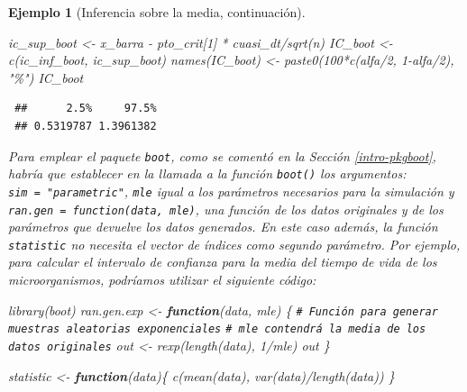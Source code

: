 \documentclass[
]{book}
\newenvironment{Shaded}{\begin{snugshade}}{\end{snugshade}}
\newcommand{\CommentTok}[1]{\textcolor[rgb]{0.56,0.35,0.01}{\textit{#1}}}
\newcommand{\ControlFlowTok}[1]{\textcolor[rgb]{0.13,0.29,0.53}{\textbf{#1}}}
\newcommand{\DecValTok}[1]{\textcolor[rgb]{0.00,0.00,0.81}{#1}}
\newcommand{\FunctionTok}[1]{\textcolor[rgb]{0.00,0.00,0.00}{#1}}
\newcommand{\NormalTok}[1]{#1}
\newcommand{\OtherTok}[1]{\textcolor[rgb]{0.56,0.35,0.01}{#1}}
\newcommand{\SpecialCharTok}[1]{\textcolor[rgb]{0.00,0.00,0.00}{#1}}
\newcommand{\StringTok}[1]{\textcolor[rgb]{0.31,0.60,0.02}{#1}}
\theoremstyle{break}
\newtheorem{example}{Ejemplo}[chapter]
\theoremstyle{nonumberplain}
\renewcommand{\CommentTok}[1]{\textcolor[rgb]{0.41,0.41,0.41}{\texttt{#1}}}
\begin{document}
\begin{example}[Inferencia sobre la media, continuación]
\begin{Shaded}
\begin{Highlighting}[]
\NormalTok{ic\_sup\_boot }\OtherTok{\textless{}{-}}\NormalTok{ x\_barra }\SpecialCharTok{{-}}\NormalTok{ pto\_crit[}\DecValTok{1}\NormalTok{] }\SpecialCharTok{*}\NormalTok{ cuasi\_dt}\SpecialCharTok{/}\FunctionTok{sqrt}\NormalTok{(n)}
\NormalTok{IC\_boot }\OtherTok{\textless{}{-}} \FunctionTok{c}\NormalTok{(ic\_inf\_boot, ic\_sup\_boot)}
\FunctionTok{names}\NormalTok{(IC\_boot) }\OtherTok{\textless{}{-}} \FunctionTok{paste0}\NormalTok{(}\DecValTok{100}\SpecialCharTok{*}\FunctionTok{c}\NormalTok{(alfa}\SpecialCharTok{/}\DecValTok{2}\NormalTok{, }\DecValTok{1}\SpecialCharTok{{-}}\NormalTok{alfa}\SpecialCharTok{/}\DecValTok{2}\NormalTok{), }\StringTok{"\%"}\NormalTok{)}
\NormalTok{IC\_boot}
\end{Highlighting}
\end{Shaded}

\begin{verbatim}
 ##      2.5%     97.5% 
 ## 0.5319787 1.3961382
\end{verbatim}

Para emplear el paquete \texttt{boot}, como se comentó en la Sección
\ref{intro-pkgboot}, habría que establecer en la llamada a la
función \texttt{boot()} los argumentos: \texttt{sim\ =\ "parametric"},
\texttt{mle} igual a los parámetros necesarios para la simulación y
\texttt{ran.gen\ =\ function(data,\ mle)}, una función de los datos originales
y de los parámetros que devuelve los datos generados.
En este caso además, la función \texttt{statistic} no necesita el vector
de índices como segundo parámetro.
Por ejemplo, para calcular el intervalo de confianza para la media del
tiempo de vida de los microorganismos, podríamos utilizar el siguiente código:

\begin{Shaded}
\begin{Highlighting}[]
\FunctionTok{library}\NormalTok{(boot)}
\NormalTok{ran.gen.exp }\OtherTok{\textless{}{-}} \ControlFlowTok{function}\NormalTok{(data, mle) \{}
    \CommentTok{\# Función para generar muestras aleatorias exponenciales}
    \CommentTok{\# mle contendrá la media de los datos originales}
\NormalTok{    out }\OtherTok{\textless{}{-}} \FunctionTok{rexp}\NormalTok{(}\FunctionTok{length}\NormalTok{(data), }\DecValTok{1}\SpecialCharTok{/}\NormalTok{mle)}
\NormalTok{    out}
\NormalTok{\}}

\NormalTok{statistic }\OtherTok{\textless{}{-}} \ControlFlowTok{function}\NormalTok{(data)\{}
    \FunctionTok{c}\NormalTok{(}\FunctionTok{mean}\NormalTok{(data), }\FunctionTok{var}\NormalTok{(data)}\SpecialCharTok{/}\FunctionTok{length}\NormalTok{(data))}
\NormalTok{\}}


\end{Highlighting}
\end{Shaded}
\end{example}
\end{document}
